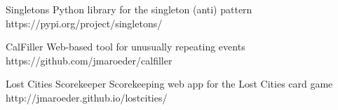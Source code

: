 



\begin{cvhonors}


\cvhonor
{Singletons} %
{Python library for the singleton (anti) pattern} %
{https://pypi.org/project/singletons/} %


\cvhonor
{CalFiller} %
{Web-based tool for unusually repeating events} %
{https://github.com/jmaroeder/calfiller} %


\cvhonor
{Lost Cities Scorekeeper} %
{Scorekeeping web app for the Lost Cities card game} %
{http://jmaroeder.github.io/lostcities/} %


\end{cvhonors}



